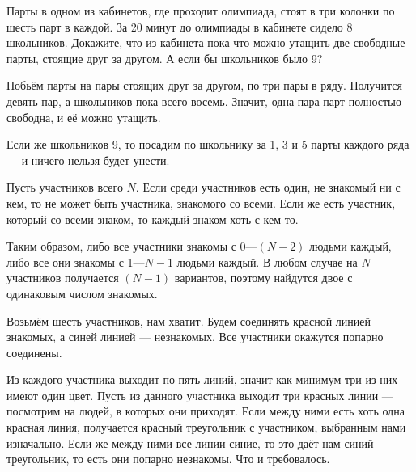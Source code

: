 \begin{itemize}

\itA Парты в одном из кабинетов, где проходит олимпиада, стоят в три колонки по шесть парт в каждой. За 20 минут до олимпиады в кабинете сидело 8 школьников. Докажите, что из кабинета пока что можно утащить две свободные парты, стоящие друг за другом. А если бы школьников было 9?

Побьём парты на пары стоящих друг за другом, по три пары в ряду. Получится девять пар, а школьников пока всего восемь. Значит, одна пара парт полностью свободна, и её можно утащить.

Если же школьников 9, то посадим по школьнику за 1, 3 и 5 парты каждого ряда — и ничего нельзя будет унести.

\itB Пусть участников всего $N$. Если среди участников есть один, не знакомый ни с кем, то не может быть участника, знакомого со всеми. Если же есть участник, который со всеми знаком, то каждый знаком хоть с кем-то.

Таким образом, либо все участники знакомы с 0—$(N-2)$ людьми каждый, либо все они знакомы с 1—$N-1$ людьми каждый. В любом случае на $N$ участников получается $(N-1)$ вариантов, поэтому найдутся двое с одинаковым числом знакомых.

\itC Возьмём шесть участников, нам хватит. Будем соединять красной линией знакомых, а синей линией — незнакомых. Все участники окажутся попарно соединены.

Из каждого участника выходит по пять линий, значит как минимум три из них имеют один цвет. Пусть из данного участника выходит три красных линии — посмотрим на людей, в которых они приходят. Если между ними есть хоть одна красная линия, получается красный треугольник с участником, выбранным нами изначально. Если же между ними все линии синие, то это даёт нам синий треугольник, то есть они попарно незнакомы. Что и требовалось.

\end{itemize}